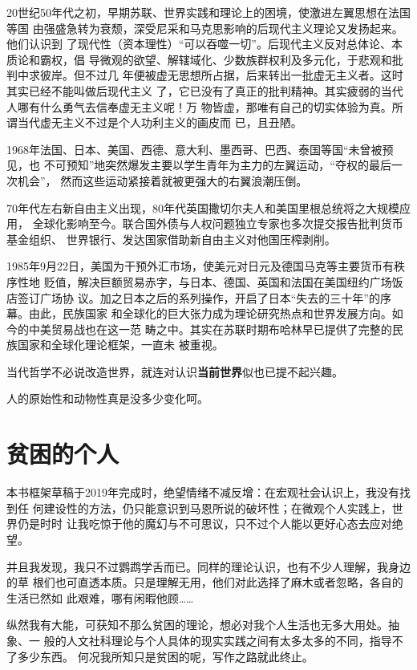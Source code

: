 20世纪50年代之初，早期苏联、世界实践和理论上的困境，使激进左翼思想在法国等国
由强盛急转为衰颓，深受尼采和马克思影响的后现代主义理论又发扬起来。他们认识到
了现代性（资本理性）“可以吞噬一切”。后现代主义反对总体论、本质论和霸权，倡
导微观的欲望、解辖域化、少数族群权利及多元化，于悲观和批判中求彼岸。但不过几
年便被虚无思想所占据，后来转出一批虚无主义者。这时其实已经不能叫做后现代主义
了，它已没有了真正的批判精神。其实疲弱的当代人哪有什么勇气去信奉虚无主义呢！万
物皆虚，那唯有自己的切实体验为真。所谓当代虚无主义不过是个人功利主义的画皮而
已，且丑陋。

1968年法国、日本、美国、西德、意大利、墨西哥、巴西、泰国等国“未曾被预见，也
不可预知”地突然爆发主要以学生青年为主力的左翼运动，“夺权的最后一次机会”，
然而这些运动紧接着就被更强大的右翼浪潮压倒。

70年代左右新自由主义出现，80年代英国撒切尔夫人和美国里根总统将之大规模应用，
全球化影响至今。联合国外债与人权问题独立专家也多次提交报告批判货币基金组织、
世界银行、发达国家借助新自由主义对他国压榨剥削。

1985年9月22日，美国为干预外汇市场，使美元对日元及德国马克等主要货币有秩序性地
贬值，解决巨额贸易赤字，与日本、德国、英国和法国在美国纽约广场饭店签订广场协
议。加之日本之后的系列操作，开启了日本“失去的三十年”的序幕。由此，民族国家
和全球化的巨大张力成为理论研究热点和世界发展方向。如今的中美贸易战也在这一范
畴之中。其实在苏联时期布哈林早已提供了完整的民族国家和全球化理论框架，一直未
被重视。

当代哲学不必说改造世界，就连对认识\textbf{当前世界}似也已提不起兴趣。

人的原始性和动物性真是没多少变化呵。

\section*{贫困的个人}

本书框架草稿于2019年完成时，绝望情绪不减反增：在宏观社会认识上，我没有找到任
何建设性的方法，仍只能意识到马恩所说的破坏性；在微观个人实践上，世界仍是时时
让我吃惊于他的魔幻与不可思议，只不过个人能以更好心态去应对绝望。

并且我发现，我只不过鹦鹉学舌而已。同样的理论认识，也有不少人理解，我身边的草
根们也可直透本质。只是理解无用，他们对此选择了麻木或者忽略，各自的生活已然如
此艰难，哪有闲暇他顾……

纵然我有大能，可获知不那么贫困的理论，想必对我个人生活也无多大用处。抽象、一
般的人文社科理论与个人具体的现实实践之间有太多太多的不同，指导不了多少东西。
何况我所知只是贫困的呢，写作之路就此终止。

